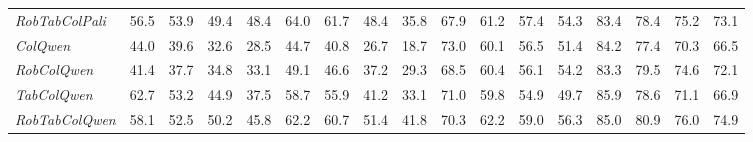 \begin{table*}[t]
\begin{tabular*}{1.03\linewidth}{@{\extracolsep{\fill}}l|cccc|cccc|cccc|cccc}
\hspace{0.3cm}\textit{RobTabColPali} & 
56.5 & 53.9 & 49.4 & 48.4 & 
64.0 & 61.7 & 48.4 & 35.8 & 
67.9 & 61.2 & 57.4 & 54.3 & 
83.4 & 78.4 & 75.2 & 73.1 \\
\addlinespace
\textit{ColQwen} & 
44.0 & 39.6 & 32.6 & 28.5 & 
44.7 & 40.8 & 26.7 & 18.7 & 
73.0 & 60.1 & 56.5 & 51.4 & 
84.2 & 77.4 & 70.3 & 66.5 \\

\hspace{0.3cm}\textit{RobColQwen} & 
41.4 & 37.7 & 34.8 & 33.1 & 
49.1 & 46.6 & 37.2 & 29.3 & 
68.5 & 60.4 & 56.1 & 54.2 & 
83.3 & 79.5 & 74.6 & 72.1 \\

\hspace{0.3cm}\textit{TabColQwen} & 
62.7 & 53.2 & 44.9 & 37.5 & 
58.7 & 55.9 & 41.2 & 33.1 & 
71.0 & 59.8 & 54.9 & 49.7 & 
85.9 & 78.6 & 71.1 & 66.9 \\

\hspace{0.3cm}\textit{RobTabColQwen} & 
58.1 & 52.5 & 50.2 & 45.8 & 
62.2 & 60.7 & 51.4 & 41.8 & 
70.3 & 62.2 & 59.0 & 56.3 & 
85.0 & 80.9 & 76.0 & 74.9 \\

\bottomrule
\end{tabular*}
\label{Table:rephrasing_benchmarks_recall1}
\end{table*}



